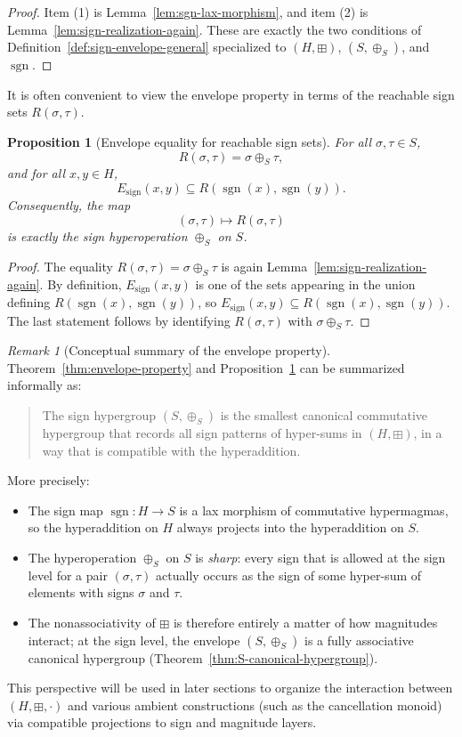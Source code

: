 \documentclass[11pt]{amsart}
\numberwithin{equation}{section}
\newtheorem{proposition}[theorem]{Proposition}
\theoremstyle{definition}
\theoremstyle{remark}
\newtheorem{remark}[theorem]{Remark}
\newcommand{\Hnum}{H}                      %
\newcommand{\Sset}{S}                      %
\newcommand{\sgn}{\operatorname{sgn}}
\newcommand{\op}{\boxplus}                 %
\newcommand{\sop}{\oplus_S}                %
\begin{document}
\begin{proof}
Item (1) is Lemma~\ref{lem:sgn-lax-morphism}, and item (2) is
Lemma~\ref{lem:sign-realization-again}.  These are exactly the two
conditions of Definition~\ref{def:sign-envelope-general} specialized
to $(\Hnum,\op)$, $(\Sset,\sop)$, and $\sgn$.
\end{proof}

It is often convenient to view the envelope property in terms of the
reachable sign sets $R(\sigma,\tau)$.

\begin{proposition}[Envelope equality for reachable sign sets]
\label{prop:envelope-R}
For all $\sigma,\tau\in\Sset$,
\[
  R(\sigma,\tau)
  = \sigma\sop\tau,
\]
and for all $x,y\in\Hnum$,
\[
  E_{\mathrm{sign}}(x,y)
  \subseteq R(\sgn(x),\sgn(y)).
\]
Consequently, the map
\[
  (\sigma,\tau)\longmapsto R(\sigma,\tau)
\]
is exactly the sign hyperoperation $\sop$ on $\Sset$.
\end{proposition}

\begin{proof}
The equality $R(\sigma,\tau)=\sigma\sop\tau$ is again
Lemma~\ref{lem:sign-realization-again}.  By definition,
$E_{\mathrm{sign}}(x,y)$ is one of the sets appearing in the union
defining $R(\sgn(x),\sgn(y))$, so
$E_{\mathrm{sign}}(x,y)\subseteq R(\sgn(x),\sgn(y))$.  The last
statement follows by identifying $R(\sigma,\tau)$ with
$\sigma\sop\tau$.
\end{proof}

\begin{remark}[Conceptual summary of the envelope property]
\label{rem:envelope-summary}
Theorem~\ref{thm:envelope-property} and
Proposition~\ref{prop:envelope-R} can be summarized informally as:
\begin{quote}
  The sign hypergroup $(\Sset,\sop)$ is the smallest canonical
  commutative hypergroup that records all sign patterns of hyper-sums
  in $(\Hnum,\op)$, in a way that is compatible with the hyperaddition.
\end{quote}
More precisely:
\begin{itemize}[leftmargin=2em]
  \item The sign map $\sgn:\Hnum\to\Sset$ is a lax morphism of
        commutative hypermagmas, so the hyperaddition on $\Hnum$
        always projects into the hyperaddition on $\Sset$.
  \item The hyperoperation $\sop$ on $\Sset$ is \emph{sharp}: every
        sign that is allowed at the sign level for a pair
        $(\sigma,\tau)$ actually occurs as the sign of some hyper-sum
        of elements with signs $\sigma$ and $\tau$.
  \item The nonassociativity of $\op$ is therefore entirely a matter
        of how magnitudes interact; at the sign level, the envelope
        $(\Sset,\sop)$ is a fully associative canonical hypergroup
        (Theorem~\ref{thm:S-canonical-hypergroup}).
\end{itemize}
This perspective will be used in later sections to organize the
interaction between $(\Hnum,\op,\cdot)$ and various ambient
constructions (such as the cancellation monoid) via compatible
projections to sign and magnitude layers.
\end{remark}
\end{document}
